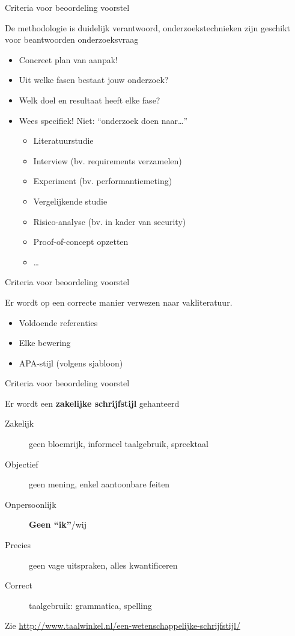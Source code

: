 \documentclass[usenames,dvipsnames]{beamer}
\begin{document}
\begin{frame}{Criteria voor beoordeling voorstel}

De methodologie is duidelijk verantwoord, onderzoekstechnieken zijn geschikt voor beantwoorden onderzoeksvraag

\begin{itemize}
  \item Concreet plan van aanpak!
  \item Uit welke fasen bestaat jouw onderzoek?
  \item Welk doel en resultaat heeft elke fase?
  \item Wees specifiek! Niet: ``onderzoek doen naar\ldots''
  \begin{itemize}
    \item Literatuurstudie
    \item Interview (bv. requirements verzamelen)
    \item Experiment (bv. performantiemeting)
    \item Vergelijkende studie
    \item Risico-analyse (bv. in kader van security)
    \item Proof-of-concept opzetten
    \item \ldots
  \end{itemize}
\end{itemize}

\end{frame}

\begin{frame}{Criteria voor beoordeling voorstel}

Er wordt op een correcte manier verwezen naar vakliteratuur.

\begin{itemize}
  \item Voldoende referenties
  \item Elke bewering
  \item APA-stijl (volgens sjabloon)
\end{itemize}

\end{frame}

\begin{frame}{Criteria voor beoordeling voorstel}

Er wordt een \textbf{zakelijke schrijfstijl} gehanteerd

\begin{description}
  \item[Zakelijk] geen bloemrijk, informeel taalgebruik, spreektaal
  \item[Objectief] geen mening, enkel aantoonbare feiten
  \item[Onpersoonlijk] \textbf{Geen ``ik''}/wij
  \item[Precies] geen vage uitspraken, alles kwantificeren
  \item[Correct] taalgebruik: grammatica, spelling
\end{description}

Zie \url{http://www.taalwinkel.nl/een-wetenschappelijke-schrijfstijl/}

\end{frame}
\end{document}
